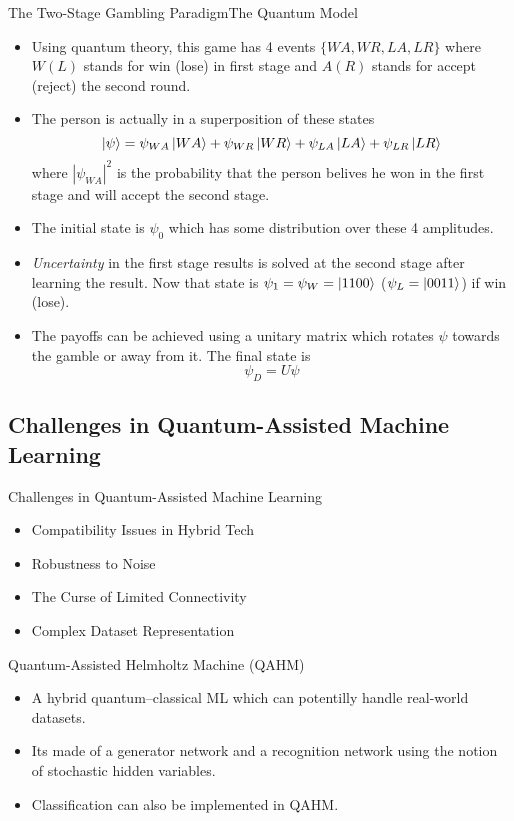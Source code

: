 \documentclass[aspectratio=169, handout]{beamer}
\newcommand{\qbit}{\ensuremath|\psi\rangle}
\theoremstyle{example}
\begin{document}
\begin{frame}{The Two-Stage Gambling Paradigm}{The Quantum Model}
  \begin{itemize}
  \pause\item Using quantum theory, this game has 4 events $\{WA, WR, LA, LR\}$ where $W (L)$ stands for win (lose) in first stage and $A (R)$ stands for accept (reject) the second round. 
  \pause\item The person is actually in a superposition of these states \[\qbit = \psi_{WA}\ket{WA} + \psi_{WR}\ket{WR} + \psi_{LA}\ket{LA} + \psi_{LR}\ket{LR}\] where $|\psi_{WA}|^2$ is the probability that the person belives he won in the first stage and will accept the second stage.
  \pause\item The initial state is $\psi_0$ which has some distribution over these 4 amplitudes.
  \pause\item \emph{Uncertainty} in the first stage results is solved at the second stage after learning the result. Now that state is $\psi_1 = \psi_W = \ket{1100}$ ($\psi_L = \ket{0011}$) if win (lose). 
  \pause\item The payoffs can be achieved using a unitary matrix which rotates $\psi$ towards the gamble or away from it. The final state is \[\psi_D = U\psi\]%
  \end{itemize}
\end{frame}
\subsection{Challenges in Quantum-Assisted Machine Learning}
\begin{frame}{Challenges in Quantum-Assisted Machine Learning}
  \begin{itemize}
  \pause\item {Compatibility Issues in Hybrid Tech
  }
  \pause\item {Robustness to Noise
  }
  \pause\item {The Curse of Limited Connectivity
  }
  \pause\item {Complex Dataset Representation
  }
  \end{itemize}
\end{frame}
\begin{frame}{Quantum-Assisted Helmholtz Machine (QAHM)}
  \begin{itemize}
  \pause\item {
    A hybrid quantum–classical ML which can potentilly handle real-world datasets.
  }
  \pause\item {
    Its made of a  generator network and a recognition network using the notion of stochastic hidden variables. 
  }
  \pause\item {
   Classification can also be implemented in QAHM.
  }
  \end{itemize}
\end{frame}
\end{document}

